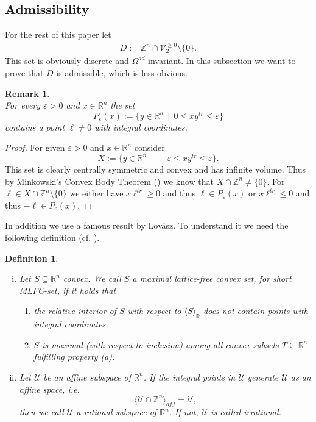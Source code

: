 \documentclass[10pt, preprint]{elsarticle}
\newtheorem{definition}[theorem]{Definition}
\newtheorem{remark}[theorem]{Remark}
\theoremstyle{definition}
\theoremstyle{definition}
\newcommand{\Z}{\mathbb{Z}}
\newcommand{\R}{\mathbb{R}}
\newcommand{\V}{\mathcal{V}}
\newcommand{\eps}{\varepsilon}
\newcommand{\Wgeq}{\V_2^{\geq 0}}
\begin{document}
\subsection{Admissibility}
For the rest of this paper let
\begin{align} 
D:=\Z^n\cap\Wgeq\setminus\{0\}.
\label{eqD}
\end{align}
This set is obviously discrete and $\Omega^{ad}$-invariant. In this subsection we want to prove that $D$ is admissible, which is less obvious.
\begin{remark}\label{corMink}\mbox{}\\
For every $\eps>0$ and $x\in\R^n$ the set
\[P_\eps(x):=\{y\in\R^n\,\mid\, 0\leq xy^{tr} \leq \eps\}\]
contains a point $\ell\neq 0$ with integral coordinates.
\end{remark}
\begin{proof}
For given $\eps>0$ and $x\in\R^n$ consider
\[X:=\{y\in\R^n\,\mid\,-\eps\leq xy^{tr}\leq\eps\}.\]
This set is clearly centrally symmetric and convex and has infinite volume. Thus by Minkowski's Convex Body Theorem (\cite[Satz 4.4]{Neu}) we know that $X\cap \Z^n\neq\{0\}$. For $\ell\in X\cap\Z^n\setminus\{0\}$ we either have $x\ell^{tr}\geq 0$ and thus $\ell\in P_\eps(x)$ or $x\ell^{tr}\leq 0$ and thus $-\ell\in P_\eps(x)$.
\end{proof}
In addition we use a famous result by Lov\'{a}sz. To understand it we need the following definition (cf. \cite{Lov}).
\begin{definition}\mbox{}
\begin{enumerate}[(i)]
\item Let $S\subseteq\R^n$ convex. We call $S$ a \emph{maximal lattice-free convex set}, for short \emph{MLFC-set}, if it holds that
\begin{enumerate}
\item\label{p1} the relative interior of $S$ with respect to $\langle S\rangle_\R$ does not contain points with integral coordinates,
\item $S$ is maximal (with respect to inclusion) among all convex subsets $T\subseteq\R^n$ fulfilling property (a).
\end{enumerate}
\item Let $\mathcal{U}$ be an affine subspace of $\R^n$. If the integral points in $\mathcal{U}$ generate $\mathcal{U}$ as an affine space, i.e.
\[\langle \mathcal{U}\cap\Z^n\rangle_{aff}=\mathcal{U},\]
then we call $\mathcal{U}$ a \emph{rational subspace} of $\R^n$. If not, $\mathcal{U}$ is called \emph{irrational}.
\end{enumerate}
\end{definition}
\end{document}
